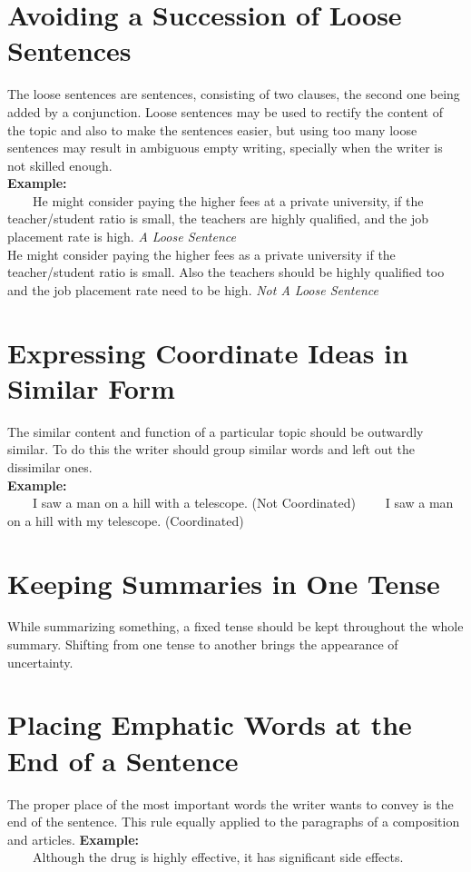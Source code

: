 \documentclass{report}
\newcommand{\xmpl}{\textbf{Example:}\\} %
\newcommand{\indnt}{\ \ \ \ } %
\begin{document}
\section{Avoiding a Succession of Loose Sentences}
The loose sentences are sentences, consisting of two clauses, the second one being added by a conjunction. Loose sentences may be used to rectify the content of the topic and also to make the sentences easier, but using too many loose sentences may result in ambiguous empty writing, specially when the writer is not skilled enough.\\
\xmpl
\indnt He might consider paying the higher fees at a private university, if the teacher/student ratio is small, the teachers are highly qualified, and the job placement rate is high. \textit{A Loose Sentence}\\
He might consider paying the higher fees as a private university if the teacher/student ratio is small. Also the teachers should be highly qualified too and the job placement rate need to be high. \textit{Not A Loose Sentence}\\
\section{Expressing Coordinate Ideas in Similar Form}
The similar content and function of a particular topic should be outwardly similar. To do this the writer should group similar words and left out the dissimilar ones.\\
\xmpl
\indnt I saw a man on a hill with a telescope. (Not Coordinated)
\indnt I saw a man on a hill with my telescope. (Coordinated)\\
\section{Keeping Summaries in One Tense}
While summarizing something, a fixed tense should be kept throughout the whole summary. Shifting from one tense to another brings the appearance of uncertainty.

\section{Placing Emphatic Words at the End of a Sentence}
The proper place of the most important words the writer wants to convey is the end of the sentence. This rule equally applied to the paragraphs of a composition and articles.
\xmpl
\indnt Although the drug is highly effective, it has significant side effects.
\end{document}
